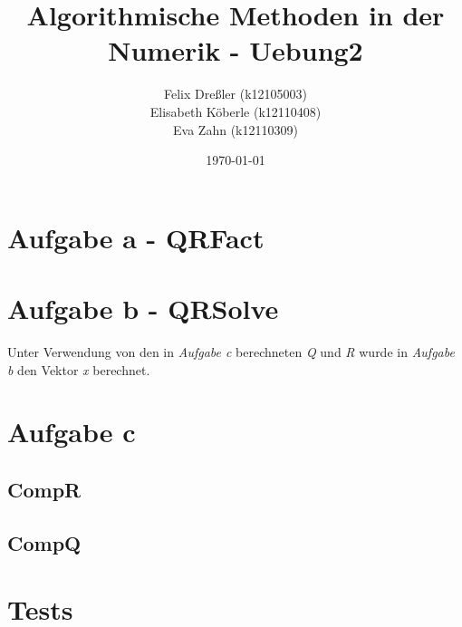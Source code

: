 \documentclass[11pt,titlepage]{article}
\title{Algorithmische Methoden in der Numerik - Uebung2}
\author{Felix Dreßler (k12105003) \\ Elisabeth Köberle (k12110408) \\ Eva Zahn (k12110309)}
\date{\today} %
\begin{document}
\maketitle

	\section{Aufgabe a - QRFact}
	
		
			
\newpage			
	\section{Aufgabe b - QRSolve}
	
	Unter Verwendung von den in \emph{Aufgabe c} berechneten \emph{Q} und \emph{R} wurde in \emph{Aufgabe b} den Vektor \emph{x} berechnet.
	
		
		
\newpage
	\section{Aufgabe c}
		\subsection{CompR}
		
			
			
		\subsection{CompQ}
		
			
			
\newpage
	\section{Tests}
\end{document}
